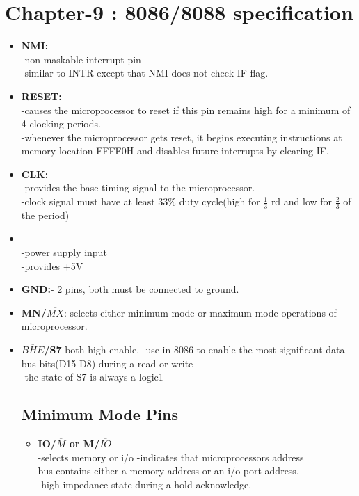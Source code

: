 \documentclass[12pt]{article}
\begin{document}
\section{Chapter-9 : 8086/8088 specification}
\begin{itemize}
	\item\textbf{NMI:}\\
	-non-maskable interrupt pin \\
	-similar to INTR except that NMI does not check IF flag.\\
	
	\item\textbf{RESET:}\\
	-causes the microprocessor to reset if this pin remains high for a minimum of 4 clocking periods.\\
	-whenever the microprocessor  gets reset, it begins executing instructions at memory location FFFF0H and disables future interrupts by clearing IF.\\
	
	\item\textbf{CLK:}\\
	-provides the base timing signal to the microprocessor.\\
	-clock signal must have at least 33\% duty cycle(high for $\frac{1}{3}$ rd and low for $\frac{2}{3}$ of the period)\\
	
	\item{}\\
	-power supply input\\
	-provides +5V \\
	
	\item\textbf{GND:}- 2 pins, both must be connected to ground.\\
	
	\item\textbf{MN/$\overline{MX}$}:-selects either minimum mode or maximum mode operations of microprocessor.\\
	
	\item\textbf{$\overline{BHE}$/S7}-both high enable.
	-use in 8086 to enable the most significant data bus bits(D15-D8) during a read or write\\
	-the state of S7 is always a logic1
	
	\subsection{Minimum Mode Pins}
	\begin{itemize}
		\item\textbf{IO/$\overline{M}$ or M/$\overline{IO}$}\\
		-selects memory or i/o 
		-indicates that microprocessors address\\ bus contains either a memory address or an i/o port address.\\
		-high impedance state during a hold acknowledge.\\ 
		

\end{itemize}
\end{itemize}
\end{document}
